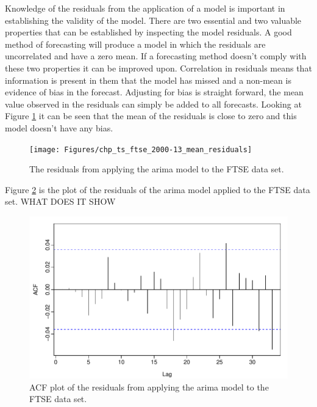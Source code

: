 Knowledge of the residuals from the application of a model is important in establishing the validity of the model. There are two essential and two valuable properties that can be established by inspecting the model residuals. A good method of forecasting will produce a model in which the residuals are uncorrelated and have a zero mean. If a forecasting method doesn't comply with these two properties it can be improved upon. Correlation in residuals means that information is present in them that the model has missed and a non-mean is evidence of bias in the forecast. Adjusting for bias is straight forward, the mean value observed in the residuals can simply be added to all forecasts. Looking at Figure \ref{fig:chp_ts_ftse_2000_13_mean_residuals} it can be seen that the mean of the residuals is close to zero and this model doesn't have any bias.

\begin{figure}[!tbh]
\centering
\texttt{[image: Figures/chp\_ts\_ftse\_2000-13\_mean\_residuals]}
\caption[FTSE 2000-13 residuals.]{The residuals from applying the arima model to the FTSE data set.}
\label{fig:chp_ts_ftse_2000_13_mean_residuals}
\end{figure}

Figure \ref{fig:chp_ts_ftse_2000_13_acf_residuals} is the plot of the residuals of the arima model applied to the FTSE data set. WHAT DOES IT SHOW \label{(todo-acf)}

\begin{figure}[!tbh]
\centering
\includegraphics{Figures/chp_ts_ftse_2000-13_acf_residuals}
\caption[FTSE 2000-13 ACF of residuals.]{ACF plot of the residuals from applying the arima model to the FTSE data set.}
\label{fig:chp_ts_ftse_2000_13_acf_residuals}
\end{figure}

